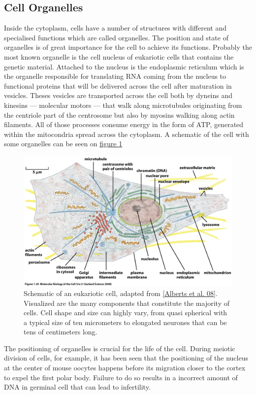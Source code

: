 \documentclass[A4paperpaper,11pt,english]{sphinxmanual}
\begin{document}
\subsection{Cell Organelles}
\label{parts/part1:cell-organelles}
Inside the cytoplasm, cells have a number of structures with different and
specialised functions which are called organelles. The position and state of
organelles is of great importance for the cell to achieve its functions.
Probably the most known organelle is the cell nucleus of eukariotic cells that
contains the genetic material. Attached to the nucleus is the endoplasmic
reticulum  which is the organelle responsible for translating
RNA coming from the nucleus to functional proteins that will be delivered
across the cell after maturation in vesicles. Theses vesicles are
transported across the cell both by dyneins and kinesins — molecular motors —
that walk along microtubules originating from the centriole part of the
centrosome but also by myosins walking along actin filaments.  All of those processes
consume energy in  the form of ATP, generated within the mitocondria spread
across the cytoplasm. A schematic of the cell with some organelles can be seen
on \hyperref[parts/part1:albertcell]{figure  \ref*{parts/part1:albertcell}}
\begin{figure}[htbp]
\centering
\capstart

\includegraphics[width=0.800\linewidth]{figure-1-30.jpg}
\caption{Schematic of an eukariotic cell, adapted from {\hyperref[parts/part1:alberts2008]{{[}Alberts et al. 08{]}}}. Visualized are
the many components that constitute the majority of cells.  Cell shape and
size can highly vary, from quasi spherical with a typical size of ten
micrometers to elongated neurones that can be tens of centimeters long.}\label{parts/part1:albertcell}\end{figure}

The positioning of organelles is crucial for the life of the cell. During
meiotic division of cells, for example, it has been seen that the positioning of
the nucleus at the center of mouse oocytes happens before its
migration closer to the cortex to expel the first polar body. Failure to do so
results in a incorrect amount of DNA in germinal cell that can lead to
infertility.
\end{document}
